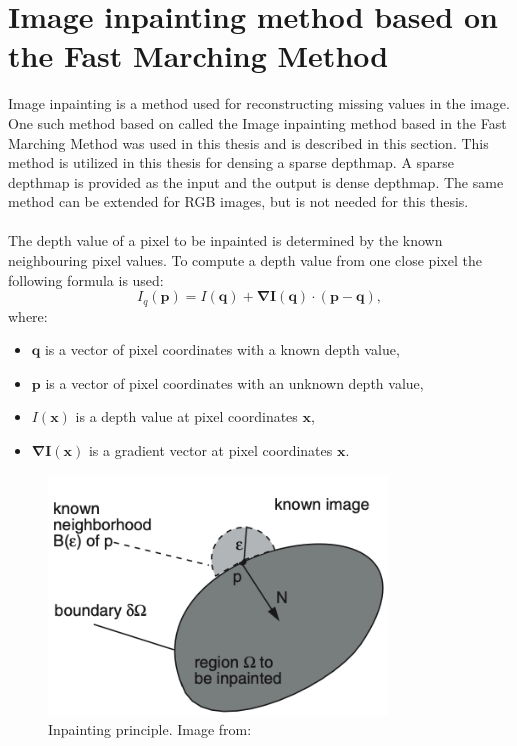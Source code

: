 \documentclass[twoside]{ctuthesis}
\theoremstyle{plain}
\theoremstyle{definition}
\theoremstyle{note}
\begin{document}
\section{Image inpainting method based on the Fast Marching Method} \label{inpainting}
Image inpainting is a method used for reconstructing missing values in the image. One such method based on \cite{cite:5} called the Image inpainting method based in the Fast Marching Method was used in this thesis and is described in this section. This method is utilized in this thesis for densing a sparse depthmap. A sparse depthmap is provided as the input and the output is dense depthmap. The same method can be extended for RGB images, but is not needed for this thesis.\\
\\
The depth value of a pixel to be inpainted is determined by the known neighbouring pixel values. To compute a depth value from one close pixel the following formula is used:
\begin{equation} \label{eq:1}
	I_q(\mathbf{p})=I(\mathbf{q})+\mathbf{\nabla I(q)}\cdot(\mathbf{p}-\mathbf{q}),
\end{equation}
where:
\begin{itemize}
	\item $\mathbf{q}$ is a vector of pixel coordinates with a known depth value,
	\item $\mathbf{p}$ is a vector of pixel coordinates with an unknown depth value,
	\item $I(\mathbf{x})$ is a depth value at pixel coordinates $\mathbf{x}$,
	\item $\mathbf{\nabla I(x)}$ is a gradient vector at pixel coordinates $\mathbf{x}$.
\end{itemize}
\begin{figure}[h]
	\centering
	\includegraphics[width=9cm]{inpaint_principle.png}
	\caption[Inpainting principle.]{Inpainting principle. Image from: \cite{cite:5}}
	\label{fig:inpaint_schema}
\end{figure}
\end{document}
